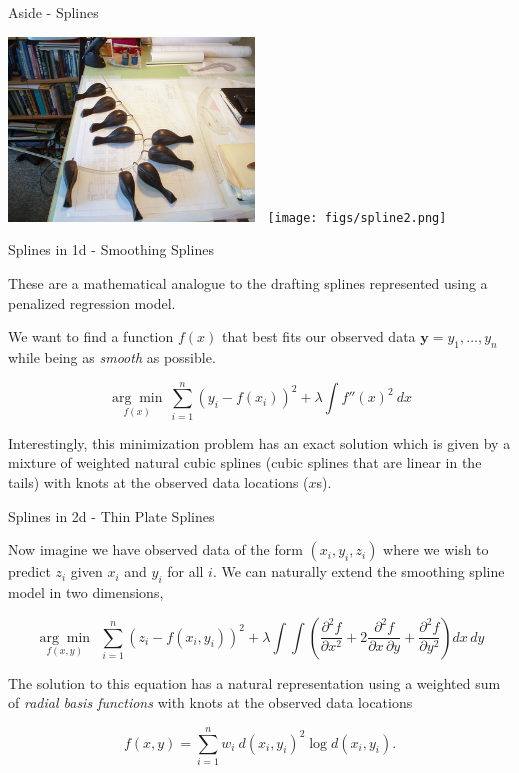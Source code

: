 \documentclass[11pt,ignorenonframetext,]{beamer}
\begin{document}
\begin{frame}{Aside - Splines}
\protect\hypertarget{aside---splines}{}

\begin{center}
\includegraphics[width=0.49\textwidth]{figs/spline1.png}
$~$
\texttt{[image: figs/spline2.png]}
\end{center}

\end{frame}

\begin{frame}[t]{Splines in 1d - Smoothing Splines}
\protect\hypertarget{splines-in-1d---smoothing-splines}{}

These are a mathematical analogue to the drafting splines represented
using a penalized regression model.

\pause

We want to find a function \(f(x)\) that best fits our observed data
\(\symbf{y} = y_1, \ldots, y_n\) while being as \emph{smooth} as
possible.

\[ \underset{f(x)}{\arg\min} ~ \sum_{i=1}^n\left(y_i - f(x_i)\right)^2 + \lambda \int f''(x)^2 ~ dx \]

Interestingly, this minimization problem has an exact solution which is
given by a mixture of weighted natural cubic splines (cubic splines that
are linear in the tails) with knots at the observed data locations
(\(x\)s).

\end{frame}

\begin{frame}{Splines in 2d - Thin Plate Splines}
\protect\hypertarget{splines-in-2d---thin-plate-splines}{}

Now imagine we have observed data of the form \((x_i, y_i, z_i)\) where
we wish to predict \(z_i\) given \(x_i\) and \(y_i\) for all \(i\). We
can naturally extend the smoothing spline model in two dimensions,

\[ \underset{f(x,y)}{\arg\min} ~~ \sum_{i=1}^n (z_i-f(x_i,y_i))^2 + \lambda \int \int \left(\frac{\partial^2 f}{\partial x^2} + 2 \frac{\partial^2 f}{\partial x \, \partial y} + \frac{\partial^2 f}{\partial y^2} \right) dx\, dy\]

The solution to this equation has a natural representation using a
weighted sum of \emph{radial basis functions} with knots at the observed
data locations

\[ f(x,y) = \sum_{i=1}^n w_i ~ d(x_i,y_i)^2 \log d(x_i,y_i).  \]

\end{frame}
\end{document}
